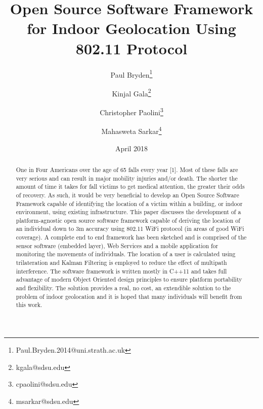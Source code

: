 \documentclass[conference]{IEEEtran}
\title{Open Source Software Framework for Indoor Geolocation Using 802.11 Protocol}
\date{April 2018}
\begin{document}
\author[1]{Paul Bryden\thanks{Paul.Bryden.2014@uni.strath.ac.uk}}
\author[2]{Kinjal Gala\thanks{kgala@sdsu.edu}}
\author[2]{Christopher Paolini\thanks{cpaolini@sdsu.edu}}
\author[2]{Mahasweta Sarkar\thanks{msarkar@sdsu.edu}}

\renewcommand\Authands{ and }
\maketitle
\begin{abstract}
One in Four Americans over the age of 65 falls every year [1].  Most of these falls are very serious and can result in major mobility injuries and/or death. The shorter the amount of time it takes for fall victims to get medical attention, the greater their odds of recovery. As such, it would be very beneficial to develop an Open Source Software Framework capable of identifying the location of a victim within a building, or indoor environment, using existing infrastructure. 
\newline \indent This paper discusses the development of a platform-agnostic open source software framework capable of deriving the location of an individual down to 3m accuracy using 802.11 WiFi protocol (in areas of good WiFi coverage). A complete end to end framework has been sketched and is comprised of the sensor software (embedded layer), Web Services and a mobile application for monitoring the movements of individuals. The location of a user is calculated using trilateration and Kalman Filtering is employed to reduce the effect of multipath interference. The software framework is written mostly in C++11 and takes full advantage of modern Object Oriented design principles to ensure platform portability and flexibility. The solution provides a real, no cost, an extendible solution to the problem of indoor geolocation and it is hoped that many individuals will benefit from this work.
\end{abstract}
\end{document}

